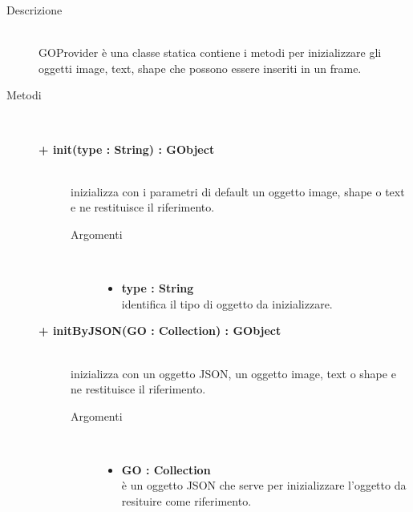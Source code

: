 \begin{description}
\item[Descrizione] \hfill \\
	GOProvider è una classe statica contiene i metodi per inizializzare gli oggetti image, text, shape che possono essere inseriti in un frame.
	
\item[Metodi] \hfill \\

	\begin{description}
		\item[\textbf{\color{blue}+ init(type : String) : GObject			}] \hfill \\
			inizializza con i parametri di default un oggetto image, shape o text e ne restituisce il riferimento.
			
		\begin{description}
			\item[Argomenti] \hfill \\
				\begin{itemize}
				
					\item \textbf{type : String			} \hfill \\
					identifica il tipo di oggetto da inizializzare.
				\end{itemize}
		\end{description}

\end{description}

	\begin{description}
		\item[\textbf{\color{blue}+ initByJSON(GO : Collection) : GObject			}] \hfill \\
			inizializza con un oggetto JSON, un oggetto image, text o shape e ne restituisce il riferimento.
			
		\begin{description}
			\item[Argomenti] \hfill \\
				\begin{itemize}
				
					\item \textbf{GO : Collection			} \hfill \\
					è un oggetto JSON che serve per inizializzare l'oggetto da resituire come riferimento.
				\end{itemize}
		\end{description}

\end{description}

\end{description}

